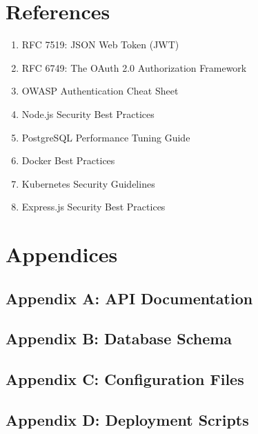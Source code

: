 \documentclass[12pt,a4paper]{article}
\begin{document}
\section{References}

\begin{enumerate}
    \item RFC 7519: JSON Web Token (JWT)
    \item RFC 6749: The OAuth 2.0 Authorization Framework
    \item OWASP Authentication Cheat Sheet
    \item Node.js Security Best Practices
    \item PostgreSQL Performance Tuning Guide
    \item Docker Best Practices
    \item Kubernetes Security Guidelines
    \item Express.js Security Best Practices
\end{enumerate}

\section{Appendices}

\subsection{Appendix A: API Documentation}

\subsection{Appendix B: Database Schema}

\subsection{Appendix C: Configuration Files}

\subsection{Appendix D: Deployment Scripts}
\end{document}

